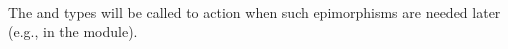 \begin{code}
\AgdaSymbol{(}\AgdaSpace{}%
\AgdaSpace{}%
\AgdaSymbol{(}\AgdaSpace{}%
\AgdaSymbol{))}\<%
\\
%
\\[\AgdaEmptyExtraSkip]%
%
\>[2]\AgdaSpace{}%
\AgdaSymbol{:}\AgdaSpace{}%
\AgdaSpace{}%
\AgdaSpace{}%
\AgdaSpace{}%
\AgdaSpace{}%
\AgdaSpace{}%
\AgdaSpace{}%
\AgdaSpace{}%
\<%
\\
%
\>[2]\AgdaSpace{}%
\AgdaSymbol{=}\AgdaSpace{}%
\AgdaSpace{}%
\AgdaSpace{}%
\AgdaSymbol{(}\AgdaSpace{}%
\AgdaSymbol{)}\AgdaSpace{}%
\<%
\end{code}
\ccpad
The  and  types will be called to action
when such epimorphisms are needed later (e.g., in the  module).
